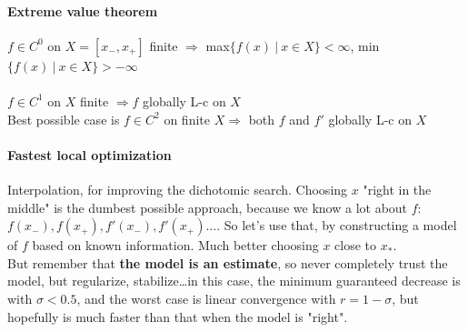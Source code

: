 \documentclass[10pt]{report}
\begin{document}
\paragraph{Extreme value theorem} $f \in C^0$ on $X = [x_-, x_+]$ finite $\Rightarrow$ max$\{f(x)\:|\: x\in X\} < \infty$, min$\{f(x)\:|\: x\in X\} > -\infty$\\\\
$f\in C^1$ on $X$ finite $\Rightarrow f$ globally L-c on $X$\\
Best possible case is $f\in C^2$ on finite $X\Rightarrow$ both $f$ and $f'$ globally L-c on $X$
\paragraph{Fastest local optimization} Interpolation, for improving the dichotomic search. Choosing $x$ "right in the middle" is the dumbest possible approach, because we know a lot about $f$: $f(x_-), f(x_+), f'(x_-), f'(x_+)\ldots$. So let's use that, by constructing a model of $f$ based on known information. Much better choosing $x$ close to $x_*$.\\
But remember that \textbf{the model is an estimate}, so never completely trust the model, but regularize, stabilize\ldots in this case, the minimum guaranteed decrease is with $\sigma < 0.5$, and the worst case is linear convergence with $r = 1 - \sigma$, but hopefully is much faster than that when the model is "right".
\end{document}
